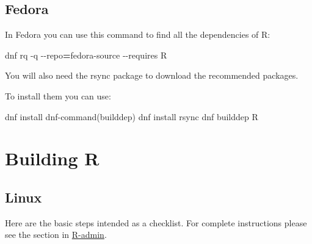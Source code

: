 \documentclass[
]{book}
\newenvironment{Shaded}{\begin{snugshade}}{\end{snugshade}}
\newcommand{\AttributeTok}[1]{\textcolor[rgb]{0.13,0.29,0.53}{#1}}
\newcommand{\ExtensionTok}[1]{#1}
\newcommand{\NormalTok}[1]{#1}
\newcommand{\OperatorTok}[1]{\textcolor[rgb]{0.81,0.36,0.00}{\textbf{#1}}}
\newcommand{\StringTok}[1]{\textcolor[rgb]{0.31,0.60,0.02}{#1}}
\begin{document}
\subsection{Fedora}\label{fedora}

In Fedora you can use this command to find all the dependencies of R:

\begin{Shaded}
\begin{Highlighting}[]
\ExtensionTok{dnf}\NormalTok{ rq }\AttributeTok{{-}q} \AttributeTok{{-}{-}repo}\OperatorTok{=}\NormalTok{fedora{-}source }\AttributeTok{{-}{-}requires}\NormalTok{ R }
\end{Highlighting}
\end{Shaded}

You will also need the rsync package to download the recommended packages.

To install them you can use:

\begin{Shaded}
\begin{Highlighting}[]
\ExtensionTok{dnf}\NormalTok{ install }\StringTok{\textquotesingle{}dnf{-}command(builddep)\textquotesingle{}}
\ExtensionTok{dnf}\NormalTok{ install rsync}
\ExtensionTok{dnf}\NormalTok{ builddep R}
\end{Highlighting}
\end{Shaded}

\section{Building R}\label{building-r}

\subsection{Linux}\label{linux}

Here are the basic steps intended as a checklist.
For complete instructions please see the section in \href{https://cran.r-project.org/doc/manuals/r-devel/R-admin.html\#Installing-R-under-Unix_002dalikes}{R-admin}.
\end{document}

